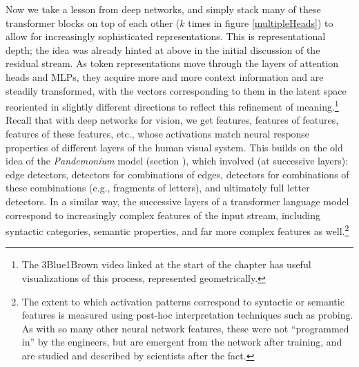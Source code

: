 Now we take a lesson from deep networks, and simply stack many of these
transformer blocks on top of each other ($k$ times in figure
\ref{multipleHeads}) to allow for increasingly sophisticated representations.
This is representational depth; the idea was already hinted at above in the
initial discussion of the residual stream. As token representations move
through the layers of attention heads and MLPs, they acquire more and more
context information and are steadily transformed, with the vectors
corresponding to them in the latent space reoriented in slightly different
directions to reflect this refinement of meaning.\footnote{The 3Blue1Brown
video linked at the start of the chapter has useful visualizations of this
process, represented geometrically.} Recall that with deep networks for vision,
we get features, features of features, features of these features, etc., whose
activations match neural response properties of different layers of the human
visual system. This builds on the old idea of the \emph{Pandemonium} model
(section ), which involved (at successive layers): edge
detectors, detectors for combinations of edges, detectors for combinations of
these combinations (e.g., fragments of letters), and ultimately full letter
detectors. In a similar way, the successive layers of a transformer language
model correspond to increasingly complex features of the input stream,
including syntactic categories, semantic properties, and far more complex
features as well.\footnote{The extent to which activation patterns correspond
to syntactic or semantic features is measured using post-hoc interpretation
techniques such as probing. As with so many other neural network features,
these were not ``programmed in'' by the engineers, but are emergent from the
network after training, and are studied and described by scientists after the
fact.}


